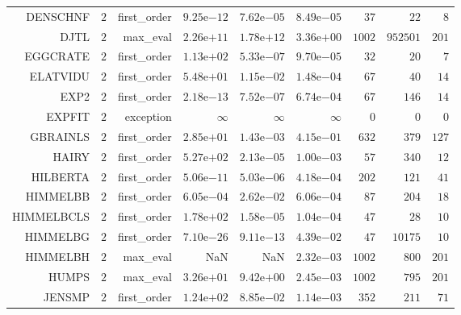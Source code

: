 \begin{longtable}{rrrrrrrrr}
DENSCHNF & \(     2\) & first\_order & \( 9.25\)e\(-12\) & \( 7.62\)e\(-05\) & \( 8.49\)e\(-05\) & \(    37\) & \(    22\) & \(     8\) \\
DJTL & \(     2\) & max\_eval & \( 2.26\)e\(+11\) & \( 1.78\)e\(+12\) & \( 3.36\)e\(+00\) & \(  1002\) & \(952501\) & \(   201\) \\
EGGCRATE & \(     2\) & first\_order & \( 1.13\)e\(+02\) & \( 5.33\)e\(-07\) & \( 9.70\)e\(-05\) & \(    32\) & \(    20\) & \(     7\) \\
ELATVIDU & \(     2\) & first\_order & \( 5.48\)e\(+01\) & \( 1.15\)e\(-02\) & \( 1.48\)e\(-04\) & \(    67\) & \(    40\) & \(    14\) \\
EXP2 & \(     2\) & first\_order & \( 2.18\)e\(-13\) & \( 7.52\)e\(-07\) & \( 6.74\)e\(-04\) & \(    67\) & \(   146\) & \(    14\) \\
EXPFIT & \(     2\) & exception & \(\infty\) & \(\infty\) & \(\infty\) & \(     0\) & \(     0\) & \(     0\) \\
GBRAINLS & \(     2\) & first\_order & \( 2.85\)e\(+01\) & \( 1.43\)e\(-03\) & \( 4.15\)e\(-01\) & \(   632\) & \(   379\) & \(   127\) \\
HAIRY & \(     2\) & first\_order & \( 5.27\)e\(+02\) & \( 2.13\)e\(-05\) & \( 1.00\)e\(-03\) & \(    57\) & \(   340\) & \(    12\) \\
HILBERTA & \(     2\) & first\_order & \( 5.06\)e\(-11\) & \( 5.03\)e\(-06\) & \( 4.18\)e\(-04\) & \(   202\) & \(   121\) & \(    41\) \\
HIMMELBB & \(     2\) & first\_order & \( 6.05\)e\(-04\) & \( 2.62\)e\(-02\) & \( 6.06\)e\(-04\) & \(    87\) & \(   204\) & \(    18\) \\
HIMMELBCLS & \(     2\) & first\_order & \( 1.78\)e\(+02\) & \( 1.58\)e\(-05\) & \( 1.04\)e\(-04\) & \(    47\) & \(    28\) & \(    10\) \\
HIMMELBG & \(     2\) & first\_order & \( 7.10\)e\(-26\) & \( 9.11\)e\(-13\) & \( 4.39\)e\(-02\) & \(    47\) & \( 10175\) & \(    10\) \\
HIMMELBH & \(     2\) & max\_eval &       NaN &       NaN & \( 2.32\)e\(-03\) & \(  1002\) & \(   800\) & \(   201\) \\
HUMPS & \(     2\) & max\_eval & \( 3.26\)e\(+01\) & \( 9.42\)e\(+00\) & \( 2.45\)e\(-03\) & \(  1002\) & \(   795\) & \(   201\) \\
JENSMP & \(     2\) & first\_order & \( 1.24\)e\(+02\) & \( 8.85\)e\(-02\) & \( 1.14\)e\(-03\) & \(   352\) & \(   211\) & \(    71\) \\

\end{longtable}
